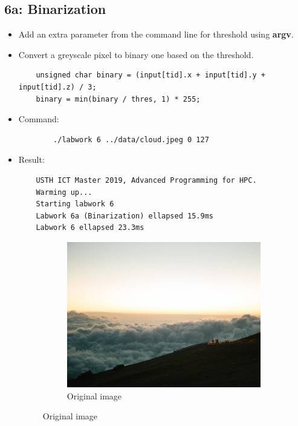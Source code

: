 \documentclass{article}
\begin{document}
\subsection{6a: Binarization}
\begin{itemize}
    \item Add an extra parameter from the command line for threshold using \textbf{argv}.
    \item Convert a greyscale pixel to binary one based on the threshold.
    \begin{verbatim}
    unsigned char binary = (input[tid].x + input[tid].y + input[tid].z) / 3;
    binary = min(binary / thres, 1) * 255;
    \end{verbatim}
    \item Command:
    \begin{verbatim}
        ./labwork 6 ../data/cloud.jpeg 0 127 
    \end{verbatim}
    \item Result:
    \begin{verbatim}
    USTH ICT Master 2019, Advanced Programming for HPC.
    Warming up...
    Starting labwork 6
    Labwork 6a (Binarization) ellapsed 15.9ms
    Labwork 6 ellapsed 23.3ms
    \end{verbatim}
    \begin{figure}[h]
      \centering
      \begin{subfigure}{.45\textwidth}
        \includegraphics[width=\linewidth]{./result/cloud.jpeg}
        \caption{Original image}
      \end{subfigure}
      \hspace{1cm}

\end{figure}
\end{itemize}
\end{document}
